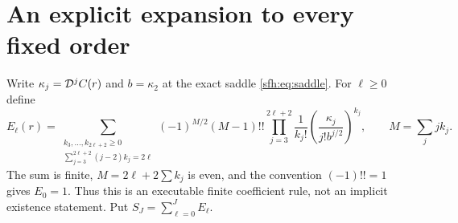 \section{An explicit expansion to every fixed order}\label{sfh:sec:coefficients}
Write $\kappa_j=\mathcal D^jC(r)$ and $b=\kappa_2$ at the exact saddle \eqref{sfh:eq:saddle}. For $\ell\ge0$ define
\begin{equation}\label{sfh:eq:Eell}
 E_\ell(r)=\sum_{\substack{k_3,\ldots,k_{2\ell+2}\ge0\\
                 \sum_{j=3}^{2\ell+2}(j-2)k_j=2\ell}}
 (-1)^{M/2}(M-1)!!
 \prod_{j=3}^{2\ell+2}\frac1{k_j!}
       \left(\frac{\kappa_j}{j!b^{j/2}}\right)^{k_j},
 \qquad M=\sum_jjk_j.
\end{equation}
The sum is finite, $M=2\ell+2\sum k_j$ is even, and the convention $(-1)!!=1$ gives $E_0=1$. Thus this is an executable finite coefficient rule, not an implicit existence statement. Put $S_J=\sum_{\ell=0}^JE_\ell$.

